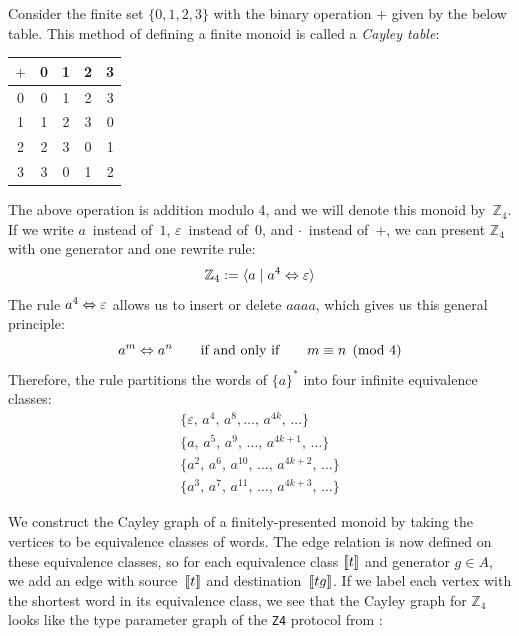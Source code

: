 \documentclass[../generics]{subfiles}
\begin{document}
\begin{example}\label{monoid z4 example}
Consider the finite set $\{0,1,2,3\}$ with the binary operation $+$ given by the below table. This method of defining a finite monoid is called a \emph{Cayley table}:
\begin{center}
\begin{tabular}{c|cccc}
$+$&0&1&2&3\\
\hline
0&0&1&2&3\\
1&1&2&3&0\\
2&2&3&0&1\\
3&3&0&1&2
\end{tabular}
\end{center}
The above operation is addition modulo 4, and we will denote this monoid by~$\mathbb{Z}_4$. If we write $a$~instead of~$1$, $\varepsilon$~instead of~$0$, and $\cdot$~instead of~$+$, we can present $\mathbb{Z}_4$ with one generator and one rewrite rule:
\[\mathbb{Z}_4 := \langle a \mid a^4\Leftrightarrow\varepsilon\rangle\]
The rule $a^4\Leftrightarrow\varepsilon$ allows us to insert or delete $aaaa$, which gives us this general principle:
\[a^m\Leftrightarrow a^n\qquad\text{if and only if}\qquad m\equiv n\pmod 4\]
Therefore, the rule partitions the words of $\{a\}^*$ into four infinite equivalence classes:
\begin{gather*}
\{\varepsilon,\, a^4,\, a^8, \ldots,\, a^{4k},\, \ldots\}\\
\{a,\, a^5,\, a^9,\, \ldots,\, a^{4k+1},\, \ldots\}\\
\{a^2,\, a^6,\, a^{10},\, \ldots,\, a^{4k+2},\, \ldots\}\\
\{a^3,\, a^7,\, a^{11},\, \ldots,\, a^{4k+3},\, \ldots\}
\end{gather*}

We construct the Cayley graph of a finitely-presented monoid by taking the vertices to be equivalence classes of words. The edge relation is now defined on these equivalence classes, so for each equivalence class $[\![t]\!]$ and generator $g\in A$, we add an edge with source~$[\![t]\!]$ and destination~$[\![tg]\!]$. If we label each vertex with the shortest word in its equivalence class, we see that the Cayley graph for $\mathbb{Z}_4$ looks like the type parameter graph of the \texttt{Z4} protocol from :

\begin{center}
\end{center}
\end{example}
\end{document}
